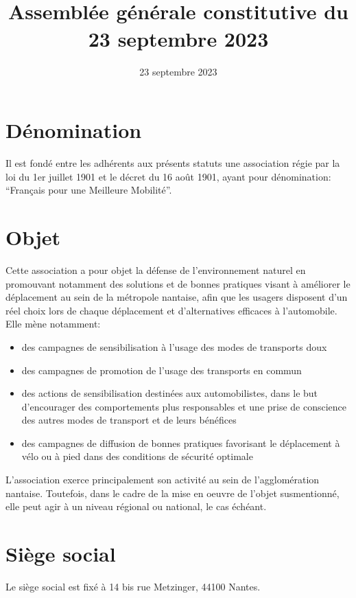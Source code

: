 \documentclass[11 pt]{article}
\title{\fmm \\[4mm]
\large Assemblée générale constitutive du 23 septembre 2023}
\date{23 septembre 2023}
\newcommand\fmm[0]{Français pour une Meilleure Mobilité}
\begin{document}
\maketitle

\section{Dénomination}

Il est fondé entre les adhérents aux présents statuts une association
régie par la loi du 1er juillet 1901 et le décret du 16 août 1901,
ayant pour dénomination: ``\fmm''.


\section{Objet}

Cette association a pour objet la défense de l'environnement naturel
en promouvant notamment des solutions et de bonnes pratiques visant à
améliorer le déplacement au sein de la métropole nantaise, afin que
les usagers disposent d'un réel choix lors de chaque déplacement et
d'alternatives efficaces à l'automobile. Elle mène notamment:

\begin{itemize}
\item des campagnes de sensibilisation à l'usage des modes de
  transports doux
\item des campagnes de promotion de l'usage des transports en commun
\item des actions de sensibilisation destinées aux automobilistes,
  dans le but d'encourager des comportements plus responsables et une
  prise de conscience des autres modes de transport et de leurs
  bénéfices
\item des campagnes de diffusion de bonnes pratiques favorisant le
  déplacement à vélo ou à pied dans des conditions de sécurité
  optimale
\end{itemize}

L'association exerce principalement son activité au sein de
l’agglomération nantaise. Toutefois, dans le cadre de la mise en
oeuvre de l'objet susmentionné, elle peut agir à un niveau régional ou
national, le cas échéant.

\section{Siège social}

Le siège social est fixé à 14 bis rue Metzinger, 44100 Nantes.
\end{document}
